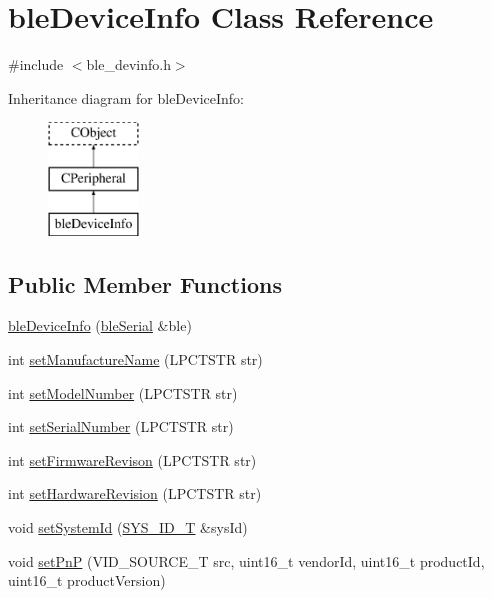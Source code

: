 \hypertarget{classble_device_info}{\section{ble\-Device\-Info Class Reference}
\label{classble_device_info}
}


{\ttfamily \#include $<$ble\-\_\-devinfo.\-h$>$}

Inheritance diagram for ble\-Device\-Info\-:\begin{figure}[H]
\begin{center}
\leavevmode
\includegraphics[height=3.000000cm]{d3/dc5/classble_device_info}
\end{center}
\end{figure}
\subsection*{Public Member Functions}
\begin{DoxyCompactItemize}
\item 
\hyperlink{classble_device_info_ae5f10713f4db98be9245aff3d482d51d}{ble\-Device\-Info} (\hyperlink{classble_serial}{ble\-Serial} \&ble)
\item 
int \hyperlink{classble_device_info_a98d7f5689f1e769f396282e3511edb99}{set\-Manufacture\-Name} (L\-P\-C\-T\-S\-T\-R str)
\item 
int \hyperlink{classble_device_info_a9e6a9696bb974ba0175968b3057e68d0}{set\-Model\-Number} (L\-P\-C\-T\-S\-T\-R str)
\item 
int \hyperlink{classble_device_info_a03fce5e655451a1245643987ca15ba71}{set\-Serial\-Number} (L\-P\-C\-T\-S\-T\-R str)
\item 
int \hyperlink{classble_device_info_a0e8825ee5d745fafdca6525fa2c230e7}{set\-Firmware\-Revison} (L\-P\-C\-T\-S\-T\-R str)
\item 
int \hyperlink{classble_device_info_aa2a08fe14dd55d02255719a1d29a484f}{set\-Hardware\-Revision} (L\-P\-C\-T\-S\-T\-R str)
\item 
void \hyperlink{classble_device_info_a372ab0246f7e19548fcef771e06dc407}{set\-System\-Id} (\hyperlink{struct_s_y_s___i_d___t}{S\-Y\-S\-\_\-\-I\-D\-\_\-\-T} \&sys\-Id)
\item 
void \hyperlink{classble_device_info_a344d50adf41337464686f926c8c85748}{set\-Pn\-P} (V\-I\-D\-\_\-\-S\-O\-U\-R\-C\-E\-\_\-\-T src, uint16\-\_\-t vendor\-Id, uint16\-\_\-t product\-Id, uint16\-\_\-t product\-Version)
\end{DoxyCompactItemize}
